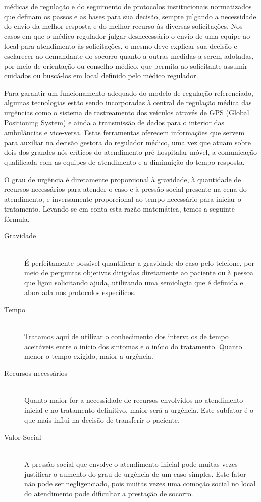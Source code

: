 médicas de regulação e do seguimento de protocolos institucionais normatizados que definam os passos e as bases para sua decisão, sempre julgando a necessidade do envio da melhor resposta e do melhor recurso às diversas solicitações. Nos casos em que o médico regulador julgar desnecessário o envio de uma equipe ao local para atendimento às solicitações, o mesmo deve explicar sua decisão e esclarecer ao demandante do socorro quanto a outras medidas a serem adotadas, por meio de orientação ou conselho médico, que permita ao solicitante assumir cuidados ou buscá-los em local definido pelo médico regulador.

Para garantir um funcionamento adequado do modelo de regulação referenciado, algumas tecnologias estão sendo incorporadas à central de regulação médica das urgências como o sistema de rastreamento dos veículos através de GPS (Global Positioning System) e ainda a transmissão de dados para o interior das ambulâncias e vice-versa.
Estas ferramentas oferecem informações que servem para auxiliar na decisão gestora do regulador médico, uma vez que atuam sobre dois dos grandes nós críticos do atendimento pré-hospitalar móvel, a comunicação qualificada com as equipes de atendimento e a diminuição do tempo resposta.


O grau de urgência é diretamente proporcional à gravidade, à quantidade de recursos necessários para atender o caso e à pressão social presente na cena do atendimento, e inversamente proporcional ao tempo necessário para iniciar o tratamento. Levando-se em conta esta razão matemática, temos a seguinte fórmula.


\begin{description}
  \item[Gravidade] \hfill \\
  É perfeitamente possível quantificar a gravidade do caso pelo telefone, por meio de perguntas objetivas dirigidas diretamente ao paciente ou à pessoa que ligou solicitando ajuda, utilizando uma semiologia que é definida e abordada nos protocolos específicos.
 \item[Tempo] \hfill \\
 Tratamos aqui de utilizar o conhecimento dos intervalos de tempo aceitáveis entre o início dos sintomas e o início do tratamento. Quanto menor o tempo exigido, maior a urgência.
 \item[Recursos necessários] \hfill \\
 Quanto maior for a necessidade de recursos envolvidos no atendimento inicial e no tratamento definitivo, maior será a urgência. Este subfator é o que mais influi na decisão de transferir o paciente.
  \item[Valor Social] \hfill \\
 A pressão social que envolve o atendimento inicial pode muitas vezes justificar o aumento do grau de urgência de um caso simples. Este fator não pode ser negligenciado, pois muitas vezes uma comoção social no local do atendimento pode dificultar a prestação de socorro.
\end{description}

